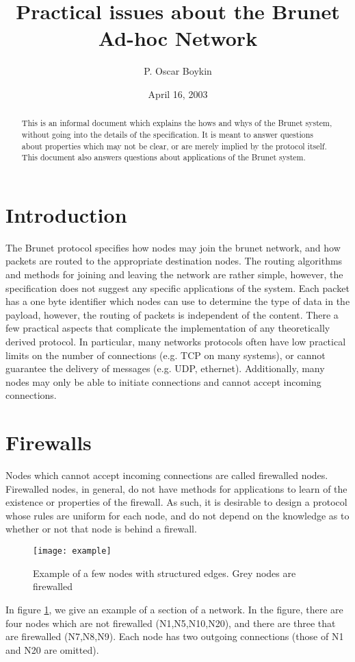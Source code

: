 \documentclass[11pt]{article}
\begin{document}
\title{Practical issues about the Brunet Ad-hoc Network}
\author{P. Oscar Boykin}
\date{April 16, 2003}
\maketitle
\begin{abstract}
This is an informal document which explains the hows and whys of the Brunet
system, without going into the details of the specification.  It is meant to
answer questions about properties which may not be clear, or are merely
implied by the protocol itself.  This document also answers questions about
applications of the Brunet system. 
\end{abstract}

\section{Introduction}
The Brunet protocol specifies how nodes may join the brunet network, and how
packets are routed to the appropriate destination nodes.  The routing
algorithms and methods for joining and leaving the network are rather simple,
however, the specification does not suggest any specific applications of the
system.  Each packet has a one byte identifier which nodes can use to
determine the type of data in the payload, however, the routing of packets is
independent of the content.  There a few practical aspects that complicate
the implementation of any theoretically derived protocol.  In particular, many
networks protocols often have low practical limits on the number of
connections (e.g. TCP on many systems), or cannot guarantee the delivery of
messages (e.g. UDP, ethernet).  Additionally, many nodes may only be able to
initiate connections and cannot accept incoming connections.

\section{Firewalls}
Nodes which cannot accept incoming connections are called firewalled nodes.
Firewalled nodes, in general, do not have methods for applications to learn of
the existence or properties of the firewall.  As such, it is desirable to
design a protocol whose rules are uniform for each node, and do not depend on
the knowledge as to whether or not that node is behind a firewall.
\begin{figure}
\centering
\texttt{[image: example]}
\caption{Example of a few nodes with structured edges.  Grey nodes are
firewalled}
\label{fig:firewall}
\end{figure}
In figure \ref{fig:firewall}, we give an example of a section of a network.
In the figure, there are four nodes which are not firewalled (N1,N5,N10,N20),
and there are three that are firewalled (N7,N8,N9).  Each node has two
outgoing connections (those of N1 and N20 are omitted).
\end{document}
